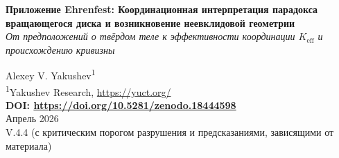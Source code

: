 \documentclass[12pt,a4paper]{article}
\begin{document}
	
	\begin{titlepage}
		\begin{center}
			\vspace*{1cm}
			\Huge\textbf{Приложение Ehrenfest: Координационная интерпретация парадокса вращающегося диска и возникновение неевклидовой геометрии} \\
			\vspace{0.5cm}
			\Large\textit{От предположений о твёрдом теле к эффективности координации \(K_{\mathrm{eff}}\) и происхождению кривизны}
			\vspace{1.5cm}
			
			\Large Alexey V. Yakushev\textsuperscript{1} \\
			\vspace{0.3cm}
			\large \textsuperscript{1}Yakushev Research, \url{https://yuct.org/} \\
			\vspace{1cm}
			\textbf{DOI: \url{https://doi.org/10.5281/zenodo.18444598}} \\
			\vspace{1cm}
			Апрель 2026 \\ \large V.4.4 (с критическим порогом разрушения и предсказаниями, зависящими от материала)
			\vspace{2cm}
			

\end{center}
\end{titlepage}
\end{document}

